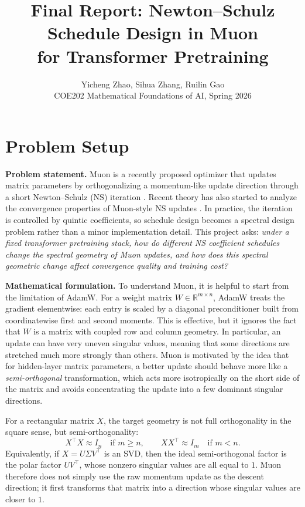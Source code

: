 \documentclass[10pt]{article}
\title{\vspace{-1.0em}\textbf{Final Report: Newton--Schulz Schedule Design in Muon\\for Transformer Pretraining}}
\author{Yicheng Zhao, Sihua Zhang, Ruilin Gao\\COE202 Mathematical Foundations of AI, Spring 2026}
\date{}
\begin{document}
\maketitle
\vspace{-1.2em}

\section{Problem Setup}
\textbf{Problem statement.}
Muon is a recently proposed optimizer that updates matrix parameters by orthogonalizing a momentum-like update direction through a short Newton--Schulz (NS) iteration \citep{jordan2024muon,moddednanogpt2024}. Recent theory has also started to analyze the convergence properties of Muon-style NS updates \citep{kim2026convergence}. In practice, the iteration is controlled by quintic coefficients, so schedule design becomes a spectral design problem rather than a minor implementation detail. This project asks:
\emph{under a fixed transformer pretraining stack, how do different NS coefficient schedules change the spectral geometry of Muon updates, and how does this spectral geometric change affect convergence quality and training cost?}

\textbf{Mathematical formulation.}
To understand Muon, it is helpful to start from the limitation of AdamW. For a weight matrix $W\in\mathbb{R}^{m\times n}$, AdamW treats the gradient elementwise: each entry is scaled by a diagonal preconditioner built from coordinatewise first and second moments. This is effective, but it ignores the fact that $W$ is a matrix with coupled row and column geometry. In particular, an update can have very uneven singular values, meaning that some directions are stretched much more strongly than others. Muon is motivated by the idea that for hidden-layer matrix parameters, a better update should behave more like a \emph{semi-orthogonal} transformation, which acts more isotropically on the short side of the matrix and avoids concentrating the update into a few dominant singular directions.

For a rectangular matrix $X$, the target geometry is not full orthogonality in the square sense, but semi-orthogonality:
\begin{equation}
    X^\top X \approx I_n \quad \text{if } m\ge n,
    \qquad
    X X^\top \approx I_m \quad \text{if } m<n.
\end{equation}
Equivalently, if $X=U\Sigma V^\top$ is an SVD, then the ideal semi-orthogonal factor is the polar factor $UV^\top$, whose nonzero singular values are all equal to $1$. Muon therefore does not simply use the raw momentum update as the descent direction; it first transforms that matrix into a direction whose singular values are closer to $1$.
\end{document}
